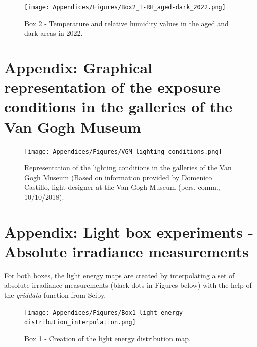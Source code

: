 \begin{appendices}
\begin{figure}[!h]
\centering
\texttt{[image: Appendices/Figures/Box2\_T-RH\_aged-dark\_2022.png]}
\caption*{Box 2 - Temperature and relative humidity values in the aged and dark areas in 2022.}
\label{fig:box2-2022_T-RH_aged-dark}
\end{figure}




\newpage
\section[\hspace{0.3cm}Van Gogh Museum - Exposure conditions]{ Appendix: Graphical representation of the exposure conditions in the galleries of the Van Gogh Museum}
\label{app:ch4_VGM_lighting}

\begin{figure}[!h]
\centering
\texttt{[image: Appendices/Figures/VGM\_lighting\_conditions.png]}
\caption*{Representation of the lighting conditions in the galleries of the Van Gogh Museum (Based on information provided by Domenico Castillo, light designer at the Van Gogh Museum (pers. comm., 10/10/2018).}
\end{figure}



\newpage
\section[\hspace{0.3cm}Light box experiments - Absolute irradiance measurements]{ Appendix: Light box experiments - Absolute irradiance measurements}
\label{app:ch4_boxes_AIS}


For both boxes, the light energy maps are created by interpolating a set of absolute irradiance measurements (black dots in Figures below) with the help of the \textit{griddata} function from Scipy. \\


\begin{figure}[!h]
\centering
\texttt{[image: Appendices/Figures/Box1\_light-energy-distribution\_interpolation.png]}
\caption*{Box 1 - Creation of the light energy distribution map.}
\end{figure}


\end{appendices}
